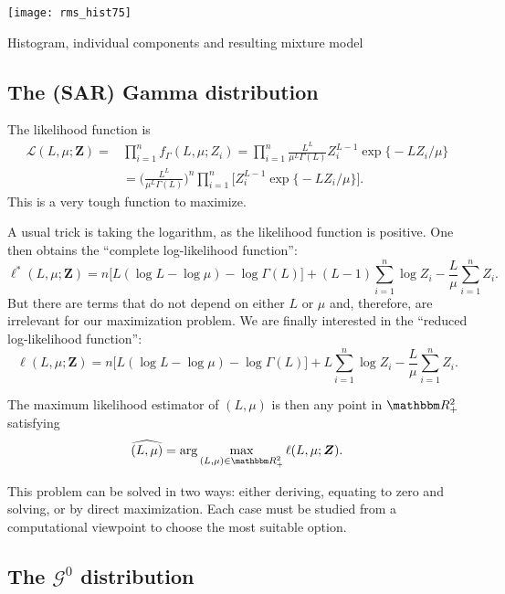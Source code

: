 \begin{marginfigure}
\centering
\texttt{[image: rms\_hist75]}
\caption{Histogram, individual components and resulting mixture model}
\label{fig:MixtureFit}
\end{marginfigure}


\subsection{The (SAR) Gamma distribution}

The likelihood function is 
\begin{align}
\mathcal L(L,\mu;\bm Z) =& \prod_{i=1}^{n}f_\Gamma(L,\mu; Z_i) = \prod_{i=1}^{n}\frac{L^L}{\mu^{L}\Gamma(L)} Z_i^{L-1} 
	\exp\big\{ -L Z_i / \mu
	\big\} \nonumber\\
	& = 
	\bigg(
	\frac{L^L}{\mu^{L}\Gamma(L)}
	\bigg)^n \prod_{i=1}^{n} \Big[Z_i^{L-1} \exp\big\{ -L Z_i / \mu
		\big\} \Big].
\end{align}
This is a very tough function to maximize.

A usual trick is taking the logarithm, as the likelihood function is positive.
One then obtains the ``complete log-likelihood function'':
\begin{equation}
\ell^*(L,\mu;\bm Z)=n\big[L(\log L - \log\mu) - \log\Gamma(L)
\big] + (L-1)\sum_{i=1}^n \log Z_i - \frac{L}{\mu} \sum_{i=1}^n Z_i.
\end{equation}
But there are terms that do not depend on either $L$ or $\mu$ and, therefore, are irrelevant for our maximization problem.
We are finally interested in the ``reduced log-likelihood function'':
\begin{equation}
\ell(L,\mu;\bm Z)=n\big[L(\log L - \log\mu) - \log\Gamma(L)
\big] + L\sum_{i=1}^n \log Z_i - \frac{L}{\mu} \sum_{i=1}^n Z_i.
\label{eq:RedLogLikGammaSAR}
\end{equation}

The maximum likelihood estimator of $(L,\mu)$ is then any point in $\mathbbm R_+^2$ satisfying
\begin{equation}
\widehat{(L,\mu)} = \arg\max_{(L,\mu)\in\mathbbm R_+^2} \ell(L,\mu;\bm Z).
\end{equation}

This problem can be solved in two ways: either deriving, equating to zero and solving, or by direct maximization.
Each case must be studied from a computational viewpoint to choose the most suitable option.

\subsection{The $\mathcal G^0$ distribution}

